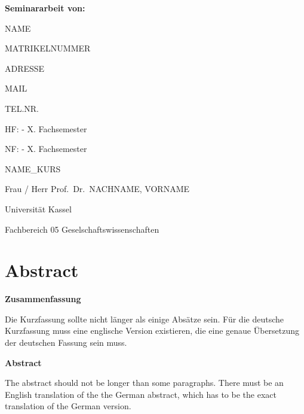 \documentclass[
  12pt,
]{article}
\author{}
\date{\vspace{-2.5em}}
\newcommand\blankpage{%
    \null
    \thispagestyle{empty}%
    \addtocounter{page}{-1}%
    \newpage}
\begin{document}

\textbf{Seminararbeit von:}

\vskip0.25cm

NAME

MATRIKELNUMMER \hspace{1em}

ADRESSE

MAIL \hspace{1em}

TEL.NR.

HF: - X. Fachsemester \hspace{1em}

NF: - X. Fachsemester

\vskip0.5cm

\vfill

NAME\_KURS

Frau / Herr Prof.~Dr.~NACHNAME, VORNAME

Universität Kassel

Fachbereich 05 Geselschaftswissenschaften \pagebreak
\afterpage{\blankpage}


\pagebreak
\afterpage{\blankpage}

\listoffigures

\pagebreak
\afterpage{\blankpage}

\listoftables

\pagebreak
\afterpage{\blankpage}

\tableofcontents

\pagebreak
\afterpage{\blankpage}



\hypertarget{abstract}{%
\section{Abstract}\label{abstract}}

\textbf{Zusammenfassung}

Die Kurzfassung sollte nicht länger als einige Absätze sein. Für die
deutsche Kurzfassung muss eine englische Version existieren, die eine
genaue Übersetzung der deutschen Fassung sein muss.

\textbf{Abstract}

The abstract should not be longer than some paragraphs. There must be an
English translation of the the German abstract, which has to be the
exact translation of the German version. \pagebreak
\end{document}
